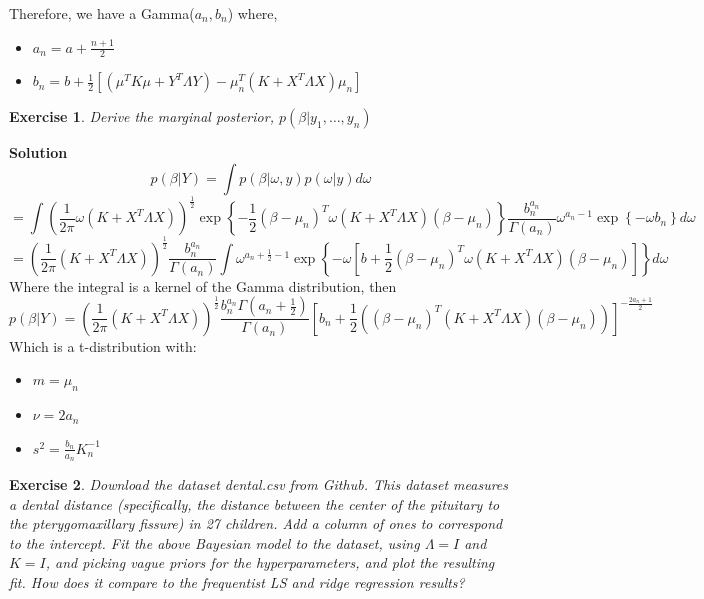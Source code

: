 \documentclass[twoside]{article}
\newcounter{lecnum}
\newtheorem{exercise}{Exercise}[lecnum]
\begin{document}
Therefore, we have a Gamma($a_n, b_n$) where,
\begin{itemize}
	\item $ a_n = a+ \frac{n+1}{2}$
	\item $ b_n = b+ \frac{1}{2} \left[ (\mu^TK\mu + Y^T\Lambda Y)- \mu_n^T (K+X^T\Lambda X)\mu_n\right] $
\end{itemize}


\color{black}


\begin{exercise}
  Derive the marginal posterior, $p(\beta|y_1,\dots, y_n)$
\end{exercise}

\color{blue}
\textbf{Solution}
$$ p(\beta | Y) = \int p(\beta | \omega, y) p(\omega | y) d\omega  $$
$$
= \int \left(\frac{1}{2 \pi} \omega(K+X^T\Lambda X)  \right)^{\frac{1}{2}} \exp \left\{ -\frac{1}{2} (\beta - \mu_n)^T\omega(K+X^T\Lambda X)(\beta - \mu_n)
\right\}
\frac{b_n^{a_n}}{\Gamma (a_n)} \omega^{a_n-1}  
\exp \left\{ 
-\omega b_n
\right\}
d \omega
$$
$$
= \left(\frac{1}{2 \pi} (K+X^T\Lambda X)  \right)^{\frac{1}{2}} 
\frac{b_n^{a_n}}{\Gamma (a_n)}  
\int \omega^{a_n+\frac{1}{2}-1}  \exp \left\{ -\omega \left[b+ \frac{1}{2} (\beta - \mu_n)^T\omega(K+X^T\Lambda X)(\beta - \mu_n)\right] 
\right\}
d \omega
$$
Where the integral is a kernel of the Gamma distribution, then
$$ p(\beta | Y) = 
\left(\frac{1}{2 \pi} (K+X^T\Lambda X)  \right)^{\frac{1}{2}} 
\frac{b_n^{a_n}\Gamma (a_n + \frac{1}{2})}{\Gamma (a_n)} 
\left[
b_n + \frac{1}{2}\left( (\beta - \mu_n)^T(K+X^T\Lambda X)(\beta - \mu_n) \right)
\right]^{-\frac{2a_n+1}{2}}
$$
Which is a t-distribution with:

\begin{itemize}
	\item  $ m  =  \mu_n$
	\item  $ \nu= 2 a_n $
	\item $ s^2 = \frac{b_n}{a_n}K_n^{-1}$
\end{itemize}

\color{black}


\begin{exercise}
  Download the dataset dental.csv from Github. This dataset measures a dental distance (specifically, the distance between the center of the pituitary to the pterygomaxillary fissure) in 27 children. Add a column of ones to correspond to the intercept. Fit the above Bayesian model to the dataset, using $\Lambda=I$ and $K=I$, and picking vague priors for the hyperparameters, and plot the resulting fit. How does it compare to the frequentist LS and ridge regression results?
\end{exercise}
\end{document}
